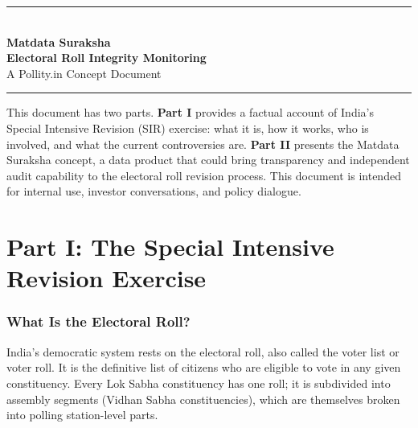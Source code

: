 \documentclass[11pt, a4paper]{article}
\begin{document}
\begin{center}
  {\color{pollityblue}\rule{\linewidth}{2pt}}\\[0.8em]
  {\Huge\bfseries\color{pollityblue} Matdata Suraksha}\\[0.4em]
  {\large\bfseries Electoral Roll Integrity Monitoring}\\[0.3em]
  {\normalsize\color{gray} A Pollity.in Concept Document}\\[0.5em]
  {\color{pollityblue}\rule{\linewidth}{2pt}}
\end{center}

\vspace{0.5em}

\begin{tcolorbox}[colback=lightgray, colframe=pollityblue, sharp corners, boxrule=0.6pt]
\small
This document has two parts. \textbf{Part I} provides a factual account of India's Special Intensive Revision (SIR) exercise: what it is, how it works, who is involved, and what the current controversies are. \textbf{Part II} presents the Matdata Suraksha concept, a data product that could bring transparency and independent audit capability to the electoral roll revision process. This document is intended for internal use, investor conversations, and policy dialogue.
\end{tcolorbox}

\vspace{1em}

\tableofcontents

\newpage

\part*{Part I: The Special Intensive Revision Exercise}

\section{What Is the Electoral Roll?}

India's democratic system rests on the electoral roll, also called the voter list or voter roll. It is the definitive list of citizens who are eligible to vote in any given constituency. Every Lok Sabha constituency has one roll; it is subdivided into assembly segments (Vidhan Sabha constituencies), which are themselves broken into polling station-level parts.
\end{document}
